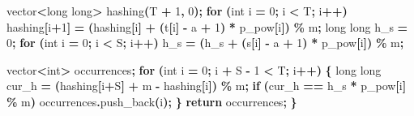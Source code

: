 \documentclass[
]{article}
\newenvironment{Shaded}{\begin{snugshade}}{\end{snugshade}}
\newcommand{\CharTok}[1]{\textcolor[rgb]{0.31,0.60,0.02}{#1}}
\newcommand{\ControlFlowTok}[1]{\textcolor[rgb]{0.13,0.29,0.53}{\textbf{#1}}}
\newcommand{\DataTypeTok}[1]{\textcolor[rgb]{0.13,0.29,0.53}{#1}}
\newcommand{\DecValTok}[1]{\textcolor[rgb]{0.00,0.00,0.81}{#1}}
\newcommand{\NormalTok}[1]{#1}
\newcommand{\OperatorTok}[1]{\textcolor[rgb]{0.81,0.36,0.00}{\textbf{#1}}}
\begin{document}
\begin{Shaded}
\begin{Highlighting}[]
\NormalTok{    vector}\OperatorTok{\textless{}}\DataTypeTok{long} \DataTypeTok{long}\OperatorTok{\textgreater{}}\NormalTok{ hashing}\OperatorTok{(}\NormalTok{T }\OperatorTok{+} \DecValTok{1}\OperatorTok{,} \DecValTok{0}\OperatorTok{);} 
    \ControlFlowTok{for} \OperatorTok{(}\DataTypeTok{int}\NormalTok{ i }\OperatorTok{=} \DecValTok{0}\OperatorTok{;}\NormalTok{ i }\OperatorTok{\textless{}}\NormalTok{ T}\OperatorTok{;}\NormalTok{ i}\OperatorTok{++)}
\NormalTok{        hashing}\OperatorTok{[}\NormalTok{i}\OperatorTok{+}\DecValTok{1}\OperatorTok{]} \OperatorTok{=} \OperatorTok{(}\NormalTok{hashing}\OperatorTok{[}\NormalTok{i}\OperatorTok{]} \OperatorTok{+} \OperatorTok{(}\NormalTok{t}\OperatorTok{[}\NormalTok{i}\OperatorTok{]} \OperatorTok{{-}} \CharTok{\textquotesingle{}a\textquotesingle{}} \OperatorTok{+} \DecValTok{1}\OperatorTok{)} \OperatorTok{*}\NormalTok{ p\_pow}\OperatorTok{[}\NormalTok{i}\OperatorTok{])} \OperatorTok{\%}\NormalTok{ m}\OperatorTok{;} 
    \DataTypeTok{long} \DataTypeTok{long}\NormalTok{ h\_s }\OperatorTok{=} \DecValTok{0}\OperatorTok{;} 
    \ControlFlowTok{for} \OperatorTok{(}\DataTypeTok{int}\NormalTok{ i }\OperatorTok{=} \DecValTok{0}\OperatorTok{;}\NormalTok{ i }\OperatorTok{\textless{}}\NormalTok{ S}\OperatorTok{;}\NormalTok{ i}\OperatorTok{++)} 
\NormalTok{        h\_s }\OperatorTok{=} \OperatorTok{(}\NormalTok{h\_s }\OperatorTok{+} \OperatorTok{(}\NormalTok{s}\OperatorTok{[}\NormalTok{i}\OperatorTok{]} \OperatorTok{{-}} \CharTok{\textquotesingle{}a\textquotesingle{}} \OperatorTok{+} \DecValTok{1}\OperatorTok{)} \OperatorTok{*}\NormalTok{ p\_pow}\OperatorTok{[}\NormalTok{i}\OperatorTok{])} \OperatorTok{\%}\NormalTok{ m}\OperatorTok{;} 

\NormalTok{    vector}\OperatorTok{\textless{}}\DataTypeTok{int}\OperatorTok{\textgreater{}}\NormalTok{ occurrences}\OperatorTok{;}
    \ControlFlowTok{for} \OperatorTok{(}\DataTypeTok{int}\NormalTok{ i }\OperatorTok{=} \DecValTok{0}\OperatorTok{;}\NormalTok{ i }\OperatorTok{+}\NormalTok{ S }\OperatorTok{{-}} \DecValTok{1} \OperatorTok{\textless{}}\NormalTok{ T}\OperatorTok{;}\NormalTok{ i}\OperatorTok{++)} \OperatorTok{\{} 
        \DataTypeTok{long} \DataTypeTok{long}\NormalTok{ cur\_h }\OperatorTok{=} \OperatorTok{(}\NormalTok{hashing}\OperatorTok{[}\NormalTok{i}\OperatorTok{+}\NormalTok{S}\OperatorTok{]} \OperatorTok{+}\NormalTok{ m }\OperatorTok{{-}}\NormalTok{ hashing}\OperatorTok{[}\NormalTok{i}\OperatorTok{])} \OperatorTok{\%}\NormalTok{ m}\OperatorTok{;} 
        \ControlFlowTok{if} \OperatorTok{(}\NormalTok{cur\_h }\OperatorTok{==}\NormalTok{ h\_s }\OperatorTok{*}\NormalTok{ p\_pow}\OperatorTok{[}\NormalTok{i}\OperatorTok{]} \OperatorTok{\%}\NormalTok{ m}\OperatorTok{)}
\NormalTok{            occurrences}\OperatorTok{.}\NormalTok{push\_back}\OperatorTok{(}\NormalTok{i}\OperatorTok{);}
    \OperatorTok{\}}
    \ControlFlowTok{return}\NormalTok{ occurrences}\OperatorTok{;}
\OperatorTok{\}}
\end{Highlighting}
\end{Shaded}
\end{document}
